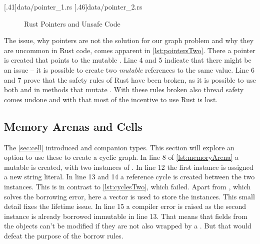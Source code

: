 \documentclass[thesis]{subfiles}
\begin{document}
    \LstTikzBox{\pointersOne}[.41\linewidth]{data/pointer_1.rs}
    \LstTikzBox{\pointersTwo}[.46\linewidth]{data/pointer_2.rs}
    \begin{figure}[ht]
      \captionsetup{type=lstlisting}
       \hfill%
      \caption{Rust Pointers and Unsafe Code}\label{lst:pointers}
    \end{figure}

    The issue, why pointers are not the solution for our graph problem and why they are uncommon in Rust code, comes apparent in \autoref{lst:pointersTwo}.
    There a pointer  is created that points to the mutable \String {}.
    Line 4 and 5 indicate that there might be an issue -- it is possible to create two \emph{mutable} references to the same value.
    Line 6 and 7 prove that the safety rules of Rust have been broken, as it is possible to use both  and  in methods that mutate .
    With these rules broken also thread safety comes undone and with that most of the incentive to use Rust is lost.

  \subsection{Memory Arenas and Cells}\label{sec:memoryArena}
    The \autoref{sec:cell} introduced \UnsafeCellT and companion types.
    This section will explore an option to use these to create a cyclic graph.
    In line 8 of \autoref{lst:memoryArena} a mutable \Vec is created, with two instances of \Node.
    In line 12 the first instance is assigned a new string literal.
    In line 13 and 14 a reference cycle is created between the two \Foo instances.
    This is in contrast to \autoref{lst:cyclesTwo}, which failed.
    Apart from \UnsafeCellT, which solves the borrowing error, here a vector is used to store the \Node instances.
    This small detail fixes the lifetime issue.
    In line 15 a compiler error is raised as the second \Node instance is already borrowed immutable in line 13.
    That means that fields from the objects can't be modified if they are not also wrapped by a \UnsafeCellT.
    But that would defeat the purpose of the borrow rules.

\end{document}
